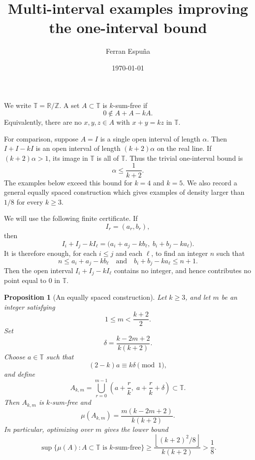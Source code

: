 \documentclass{article}
\title{Multi-interval examples improving the one-interval bound}
\author{Ferran Espu\~na}
\date{\today}
\newtheorem{proposition}{Proposition}
\begin{document}
\maketitle

We write \(\mathbb T=\mathbb R/\mathbb Z\). A set \(A\subset \mathbb T\) is
\(k\)-sum-free if
\[
    0\notin A+A-kA.
\]
Equivalently, there are no \(x,y,z\in A\) with \(x+y=kz\) in \(\mathbb T\).

For comparison, suppose \(A=I\) is a single open interval of length \(\alpha\).
Then \(I+I-kI\) is an open interval of length \((k+2)\alpha\) on the real line.
If \((k+2)\alpha>1\), its image in \(\mathbb T\) is all of \(\mathbb T\). Thus
the trivial one-interval bound is
\[
    \alpha\leq \frac1{k+2}.
\]
The examples below exceed this bound for \(k=4\) and \(k=5\). We also record
a general equally spaced construction which gives examples of density larger
than \(1/8\) for every \(k\geq 3\).

We will use the following finite certificate. If
\[
    I_r=(a_r,b_r),
\]
then
\[
    I_i+I_j-kI_\ell
    =
    \bigl(a_i+a_j-kb_\ell,\; b_i+b_j-ka_\ell\bigr).
\]
It is therefore enough, for each \(i\leq j\) and each \(\ell\), to find an
integer \(n\) such that
\[
    n\leq a_i+a_j-kb_\ell
    \quad\text{and}\quad
    b_i+b_j-ka_\ell\leq n+1.
\]
Then the open interval \(I_i+I_j-kI_\ell\) contains no integer, and hence
contributes no point equal to \(0\) in \(\mathbb T\).

\begin{proposition}[An equally spaced construction]\label{prop:equal_spacing}
Let \(k\geq 3\), and let \(m\) be an integer satisfying
\[
    1\leq m < \frac{k+2}{2}.
\]
Set
\[
    \delta=\frac{k-2m+2}{k(k+2)}.
\]
Choose \(a\in\mathbb T\) such that
\[
    (2-k)a\equiv k\delta \pmod 1,
\]
and define
\[
    A_{k,m}
    =
    \bigcup_{r=0}^{m-1}
    \left(a+\frac r k,\; a+\frac r k+\delta\right)
    \subset \mathbb T.
\]
Then \(A_{k,m}\) is \(k\)-sum-free and
\[
    \mu(A_{k,m})
    =
    \frac{m(k-2m+2)}{k(k+2)}.
\]
In particular, optimizing over \(m\) gives the lower bound
\[
    \sup \{\mu(A): A\subset\mathbb T \text{ is } k\text{-sum-free}\}
    \geq
    \frac{\left\lfloor (k+2)^2/8\right\rfloor}{k(k+2)}
    >
    \frac18.
\]
\end{proposition}
\end{document}
